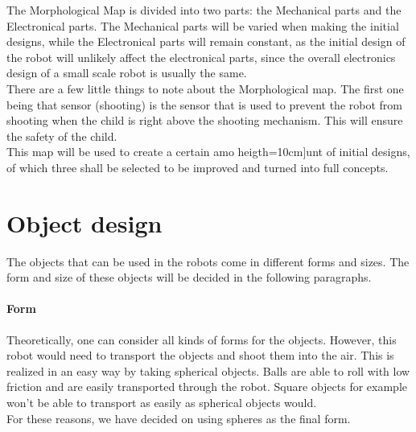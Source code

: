 \documentclass[11pt,twoside,a4paper]{report}
\begin{document}
The Morphological Map is divided into two parts: the Mechanical parts and the Electronical parts. The Mechanical parts will be varied when making the initial designs, while the Electronical parts will remain constant, as the initial design of the robot will unlikely affect the electronical parts, since the overall electronics design of a small scale robot is usually the same. \\
There are a few little things to note about the Morphological map. The first one being that sensor (shooting) is the sensor that is used to prevent the robot from shooting when the child is right above the shooting mechanism. This will ensure the safety of the child. \\
This map will be used to create a certain amo heigth=10cm]unt of initial designs, of which three shall be selected to be improved and turned into full concepts.


\chapter{Object design}
The objects that can be used in the robots come in different forms and sizes. The form and size of these objects will be decided in the following paragraphs. 
\subsubsection{Form}
Theoretically, one can consider all kinds of forms for the objects. However, this robot would need to transport the objects and shoot them into the air. This is realized in an easy way by taking spherical objects. Balls are able to roll with low friction and are easily transported through the robot. Square objects for example won’t be able to transport as easily as spherical objects would. \\
For these reasons, we have decided on using spheres as the final form. 
\end{document}
